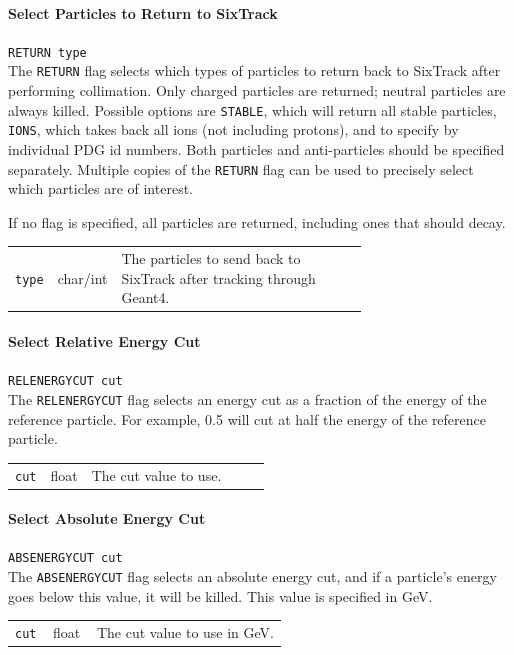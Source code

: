 \paragraph{Select Particles to Return to SixTrack} \texttt{RETURN type}\\

The \texttt{RETURN} flag selects which types of particles to return back to SixTrack after performing collimation.
Only charged particles are returned; neutral particles are always killed.
Possible options are \texttt{STABLE}, which will return all stable particles, \texttt{IONS}, which takes back all ions (not including protons), and to specify by individual PDG id numbers.
Both particles and anti-particles should be specified separately.
Multiple copies of the \texttt{RETURN} flag can be used to precisely select which particles are of interest.

If no flag is specified, all particles are returned, including ones that should decay.

\bigskip
\begin{tabular}{@{}llp{0.7\linewidth}}
    \texttt{type} & char/int & The particles to send back to SixTrack after tracking through Geant4.
\end{tabular}

\paragraph{Select Relative Energy Cut} \texttt{RELENERGYCUT cut}\\

The \texttt{RELENERGYCUT} flag selects an energy cut as a fraction of the energy of the reference particle.
For example, 0.5 will cut at half the energy of the reference particle.

\bigskip
\begin{tabular}{@{}llp{0.7\linewidth}}
    \texttt{cut} & float    & The cut value to use.
\end{tabular}

\paragraph{Select Absolute Energy Cut} \texttt{ABSENERGYCUT cut}\\

The \texttt{ABSENERGYCUT} flag selects an absolute energy cut, and if a particle's energy goes below this value, it will be killed.
This value is specified in GeV.

\bigskip
\begin{tabular}{@{}llp{0.7\linewidth}}
    \texttt{cut} & float    & The cut value to use in GeV.
\end{tabular}

